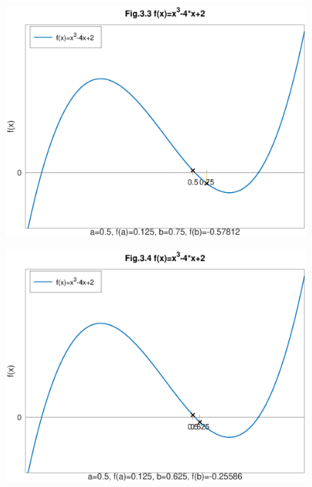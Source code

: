 \documentclass[12pt]{article}
\begin{document}
\begin{figure}[htbp]
    \begin{center}
        \includegraphics[height=90mm]{octave-fig/Fig.3.3.eps}
        \includegraphics[height=90mm]{octave-fig/Fig.3.4.eps}
    \end{center}
\end{figure}
\end{document}
